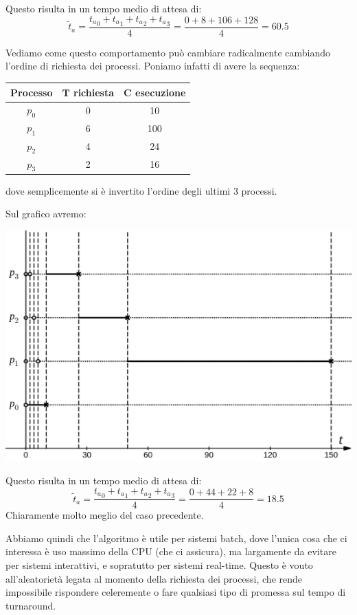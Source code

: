 \documentclass[a4paper,11pt]{article}
\begin{document}
Questo risulta in un tempo medio di attesa di:
$$
\tilde{t}_a = \frac{{t_a}_0 + {t_a}_1 + {t_a}_2 + {t_a}_3}{4} = \frac{0 + 8 + 106 + 128}{4} = 60.5
$$

Vediamo come questo comportamento può cambiare radicalmente cambiando l'ordine di richiesta dei processi. Poniamo infatti di avere la sequenza:
\begin{table}[H]
	\center {}
	\begin{tabular} { c || c | c }
		\bfseries Processo & \bfseries $\mathbf{T}$ richiesta & \bfseries $\mathbf{C}$ esecuzione \\
		\hline
		$p_0$ & 0 & 10 \\ 
		$p_1$ & 6 & 100 \\ 
		$p_2$ & 4 & 24 \\ 
		$p_3$ & 2 & 16 
	\end{tabular}
\end{table}
dove semplicemente si è invertito l'ordine degli ultimi 3 processi. 

\newpage

Sul grafico avremo:
\begin{center}
	\includegraphics[scale=0.3]{../figures/fcfs_good.png}
\end{center}

Questo risulta in un tempo medio di attesa di:
$$
\tilde{t}_a = \frac{{t_a}_0 + {t_a}_1 + {t_a}_2 + {t_a}_3}{4} = \frac{0 + 44 + 22 + 8}{4} = 18.5
$$
Chiaramente molto meglio del caso precedente.

\par\smallskip

Abbiamo quindi che l'algoritmo è utile per sistemi batch, dove l'unica cosa che ci interessa è uso massimo della CPU (che ci assicura), ma largamente da evitare per sistemi interattivi, e sopratutto per sistemi real-time.
Questo è vouto all'aleatorietà legata al momento della richiesta dei processi, che rende impossibile rispondere celeremente o fare qualsiasi tipo di promessa sul tempo di turnaround.
\end{document}
